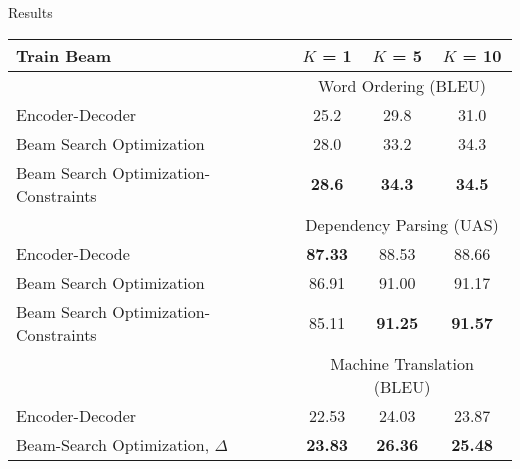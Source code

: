 

\begin{frame}{Results}
  \vspace{-0.2cm}
  \begin{table}
  \centering
    \footnotesize
  \begin{tabular}{lccc}
    \toprule
    Train Beam & $K$ = 1 & $K$ = 5 & $K$ = 10 \\
    \midrule
     & \multicolumn{3}{c}{Word Ordering (BLEU) } \\
    \midrule
    Encoder-Decoder & 25.2 & 29.8 & 31.0 \\
    Beam Search Optimization     & 28.0 & 33.2 & 34.3 \\
    Beam Search Optimization-Constraints & \textbf{28.6} & \textbf{34.3} & \textbf{34.5} \\
    \midrule



    & \multicolumn{3}{c}{Dependency Parsing (UAS) } \\
    \midrule
    Encoder-Decode & \textbf{87.33} & 88.53 & 88.66\\
    Beam Search Optimization & 86.91 & 91.00 & 91.17 \\
    Beam Search Optimization-Constraints & 85.11 & \textbf{91.25} & \textbf{91.57} \\

    \midrule

    & \multicolumn{3}{c}{Machine Translation (BLEU) } \\
    \midrule
    Encoder-Decoder & 22.53 & 24.03 & 23.87 \\
    Beam-Search Optimization, $\Delta$  & \textbf{23.83} & \textbf{26.36} & \textbf{25.48} \\
    \bottomrule
  \end{tabular}
  \label{tab:mtfinal}
\end{table}

\end{frame}


